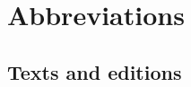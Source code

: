 \chapter{Abbreviations}
\newlength{\taiubh}
\settowidth{\taiubh}{TaiUBh} %
\addtolength{\taiubh}{12pt}
\newlength{\rightcolumn}
\setlength{\rightcolumn}{\textwidth}
\addtolength{\rightcolumn}{-\taiubh}

\newcommand{\abbrindex}[4]{%
  \index{#1@#2|see{#3}}%
  #2 & #3 \citep{#4} \\[0.50ex]
}
\section{Texts and editions}
\setlength\LTleft{0pt}
\setlength\LTright{0pt}
